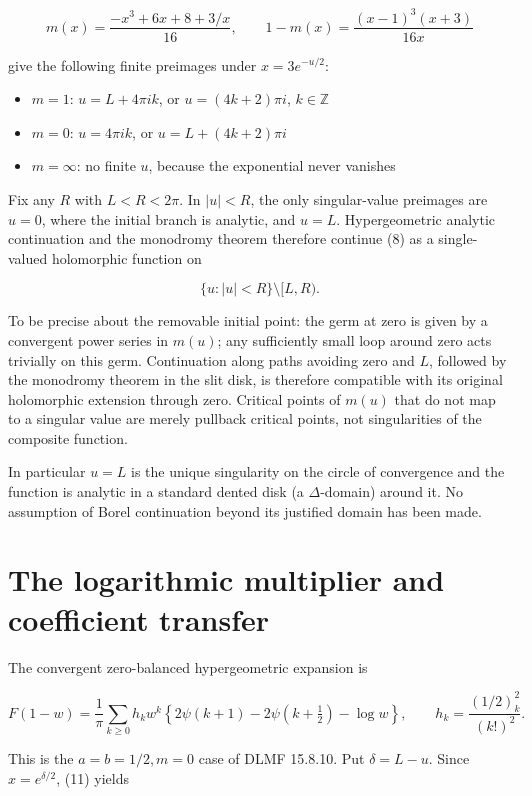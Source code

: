 \documentclass[11pt,letterpaper]{article}
\providecommand{\tightlist}{\setlength{\itemsep}{0pt}\setlength{\parskip}{0pt}}
\theoremstyle{remark}
\begin{document}
\[
m(x)=\frac{-x^3+6x+8+3/x}{16},
\qquad 1-m(x)=\frac{(x-1)^3(x+3)}{16x}
\tag{11}
\]

give the following finite preimages under \(x=3e^{-u/2}\):

\begin{itemize}
\tightlist
\item
  \(m=1\): \(u=L+4\pi ik\), or \(u=(4k+2)\pi i\), \(k\in\mathbb Z\)
\item
  \(m=0\): \(u=4\pi ik\), or \(u=L+(4k+2)\pi i\)
\item
  \(m=\infty\): no finite \(u\), because the exponential never vanishes
\end{itemize}

Fix any \(R\) with \(L<R<2\pi\). In \(|u|<R\), the only singular-value
preimages are \(u=0\), where the initial branch is analytic, and
\(u=L\). Hypergeometric analytic continuation and the monodromy theorem
therefore continue (8) as a single-valued holomorphic function on

\[
\{u:|u|<R\}\setminus[L,R).
\tag{12}
\]

To be precise about the removable initial point: the germ at zero is
given by a convergent power series in \(m(u)\); any sufficiently small
loop around zero acts trivially on this germ. Continuation along paths
avoiding zero and \(L\), followed by the monodromy theorem in the slit
disk, is therefore compatible with its original holomorphic extension
through zero. Critical points of \(m(u)\) that do not map to a singular
value are merely pullback critical points, not singularities of the
composite function.

In particular \(u=L\) is the unique singularity on the circle of
convergence and the function is analytic in a standard dented disk (a
\(\Delta\)-domain) around it. No assumption of Borel continuation beyond
its justified domain has been made.

\section{The logarithmic multiplier and coefficient
transfer}\label{the-logarithmic-multiplier-and-coefficient-transfer}

The convergent zero-balanced hypergeometric expansion is

\[
F(1-w)=\frac1\pi\sum_{k\ge0}h_kw^k
\left\{2\psi(k+1)-2\psi(k+\tfrac12)-\log w\right\},
\qquad h_k=\frac{(1/2)_k^2}{(k!)^2}.
\tag{13}
\]

This is the \(a=b=1/2,m=0\) case of DLMF 15.8.10. Put \(\delta=L-u\).
Since \(x=e^{\delta/2}\), (11) yields
\end{document}
